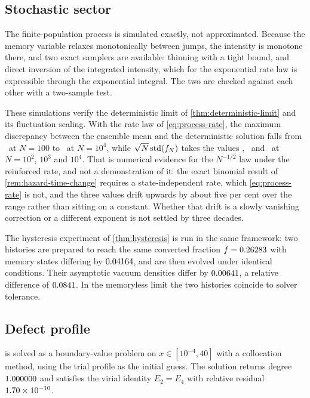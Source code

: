 \subsection{Stochastic sector}\label{sec:numerics-stochastic}

The finite-population process is simulated exactly, not approximated. Because
the memory variable relaxes monotonically between jumps, the intensity is
monotone there, and two exact samplers are available: thinning with a tight
bound, and direct inversion of the integrated intensity, which for the
exponential rate law is expressible through the exponential integral. The two
are checked against each other with a two-sample test.

These simulations verify the deterministic limit of
\cref{thm:deterministic-limit} and its fluctuation scaling. With the rate law
of \cref{eq:process-rate}, the maximum discrepancy between the ensemble mean
and the deterministic solution falls from \numConvergenceLlnErrorNOZZ\ at
$N=100$ to \numConvergenceLlnErrorNOZZZZ\ at $N=10^4$, while
$\sqrt{N}\,\mathrm{std}(f_N)$ takes the values
\numConvergenceScaledStdNOZZ, \numConvergenceScaledStdNOZZZ\ and
\numConvergenceScaledStdNOZZZZ\ at $N=10^2$, $10^3$ and $10^4$. That is
numerical evidence for the $N^{-1/2}$ law under the reinforced rate, and not a
demonstration of it: the exact binomial result of
\cref{rem:hazard-time-change} requires a state-independent rate, which
\cref{eq:process-rate} is not, and the three values drift upwards by about five
per cent over the range rather than sitting on a constant. Whether that drift
is a slowly vanishing correction or a different exponent is not settled by
three decades.

The hysteresis experiment of \cref{thm:hysteresis} is run in the same
framework: two histories are prepared to reach the same converted fraction
$f=0.26283$ with memory states differing by
$0.04164$, and are then evolved under identical conditions.
Their asymptotic vacuum densities differ by $0.00641$, a
relative difference of $0.0841$. In the memoryless
limit the two histories coincide to solver tolerance.

\subsection{Defect profile}\label{app:numerics-skyrme}

 is solved as a boundary-value problem on
$x\in[10^{-4},40]$ with a collocation method, using the trial profile as the
initial guess. The solution returns degree $1.000000$ and satisfies the
virial identity $E_2=E_4$ with relative residual
$\num{1.70e-10}$.

